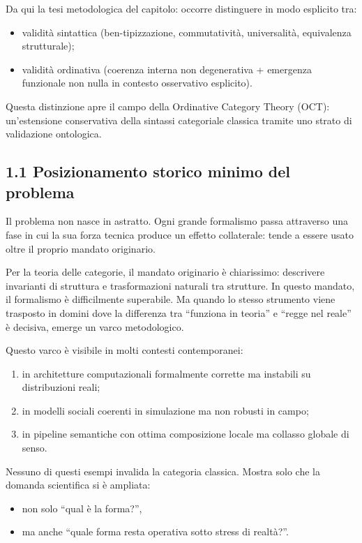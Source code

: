 Da qui la tesi metodologica del capitolo: occorre distinguere in modo esplicito tra:

\begin{itemize}
\tightlist
\item
  validità sintattica (ben-tipizzazione, commutatività, universalità, equivalenza strutturale);
\item
  validità ordinativa (coerenza interna non degenerativa + emergenza funzionale non nulla in contesto osservativo esplicito).
\end{itemize}

Questa distinzione apre il campo della Ordinative Category Theory (OCT): un'estensione conservativa della sintassi categoriale classica tramite uno strato di validazione ontologica.

\subsection{1.1 Posizionamento storico minimo del problema}

Il problema non nasce in astratto. Ogni grande formalismo passa attraverso una fase in cui la sua forza tecnica produce un effetto collaterale: tende a essere usato oltre il proprio mandato originario.

Per la teoria delle categorie, il mandato originario è chiarissimo: descrivere invarianti di struttura e trasformazioni naturali tra strutture. In questo mandato, il formalismo è difficilmente superabile. Ma quando lo stesso strumento viene trasposto in domini dove la differenza tra ``funziona in teoria'' e ``regge nel reale'' è decisiva, emerge un varco metodologico.

Questo varco è visibile in molti contesti contemporanei:

\begin{enumerate}
\def\labelenumi{\arabic{enumi}.}
\tightlist
\item
  in architetture computazionali formalmente corrette ma instabili su distribuzioni reali;
\item
  in modelli sociali coerenti in simulazione ma non robusti in campo;
\item
  in pipeline semantiche con ottima composizione locale ma collasso globale di senso.
\end{enumerate}

Nessuno di questi esempi invalida la categoria classica. Mostra solo che la domanda scientifica si è ampliata:

\begin{itemize}
\tightlist
\item
  non solo ``qual è la forma?'',
\item
  ma anche ``quale forma resta operativa sotto stress di realtà?''.
\end{itemize}

